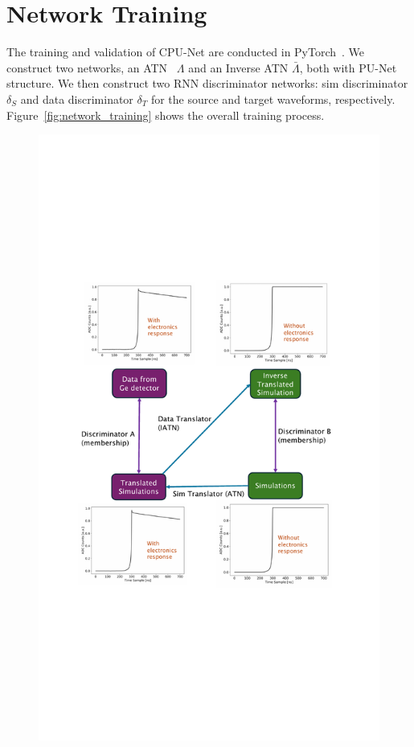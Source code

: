 \section{Network Training}

The training and validation of CPU-Net are conducted in PyTorch~\cite{pytorch}. We construct two networks, an ATN~ $\Lambda$ and an Inverse ATN $\bar{\Lambda}$, both with PU-Net structure. We then construct two RNN discriminator networks: sim discriminator $\delta_{S}$ and data discriminator $\delta_{T}$ for the source and target waveforms, respectively. Figure~\ref{fig:network_training} shows the overall training process.
\clearpage
\begin{figure}[htb!]
    \centering
    \includegraphics[width=0.99\linewidth,trim={5.5pc 20pc 6.3pc 19pc},clip]{ch7/figs/cycle_gan_training.pdf}

\end{figure}

